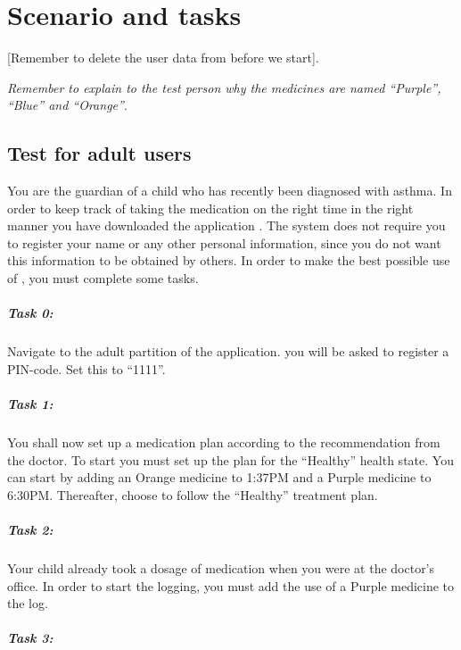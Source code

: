 \chapter{Scenario and tasks}
\label{app:scenarioandtasks}

[Remember to delete the user data from \app{} before we start]. 

\emph{Remember to explain to the test person why the medicines are named ``Purple'', ``Blue'' and ``Orange''}.


\section{Test for adult users}
\label{sec:parentstest}
You are the guardian of a child who has recently been diagnosed with asthma. In order to keep track of taking the medication on the right time in the right manner you have downloaded the application \app{}. The system does not require you to register your name or any other personal information, since you do not want this information to be obtained by others. In order to make the best possible use of \app{}, you must complete some tasks. 

\paragraph{Task 0:}

Navigate to the adult partition of the application. you will be asked to register a PIN-code. Set this to ``1111''.


\paragraph{Task 1:}

You shall now set up a medication plan according to the recommendation from the doctor. To start you must set up the plan for the ``Healthy'' health state. You can start by adding an Orange medicine to 1:37PM and a Purple medicine to 6:30PM. Thereafter, choose to follow the ``Healthy'' treatment plan.


\paragraph{Task 2:}

Your child already took a dosage of medication when you were at the doctor's office. In order to start the logging, you must add the use of a Purple medicine to the log. 


\paragraph{Task 3:}

